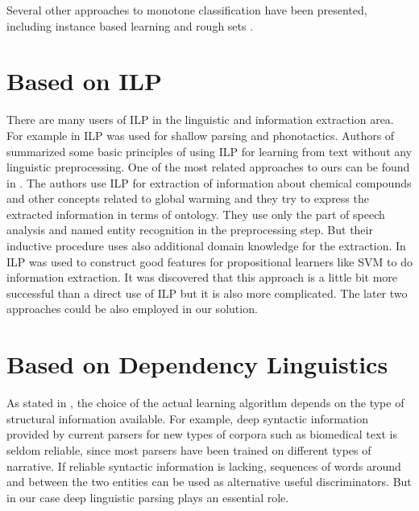 Several other approaches to monotone classification have been presented, including instance based learning \citep{biblio:ibl} and rough sets \citep{biblio:rough_sets}.









\section{Based on ILP}
There are many users of ILP in the linguistic and information extraction area.
For example in \citep{stasinos:phd} ILP was used for shallow parsing and phonotactics.
Authors of \citep{Junker99learningfor} summarized some basic principles of using ILP for learning from text without any linguistic preprocessing. One of the most related approaches to ours can be found in \citep{aitken02:_learn_infor_extrac_rules}. The authors use ILP for extraction of information about chemical compounds and other concepts related to global warming and they try to express the extracted information in terms of ontology. They use only the part of speech analysis and named entity recognition in the preprocessing step. But their inductive procedure uses also additional domain knowledge for the extraction. In \citep{Ramakrishnan:UsingILPforFeatures} ILP was used to construct good features for propositional learners like SVM to do information extraction. It was discovered that this approach is a little bit more successful than a direct use of ILP but it is also more complicated. The later two approaches could be also employed in our solution.

\section{Based on Dependency Linguistics}
As stated in \citep{Bunescu:phd}, the choice of the actual learning algorithm depends on the type of structural information available. For example, deep syntactic information provided by current parsers for new types of corpora such as biomedical text is seldom reliable, since most parsers have been trained on different types of narrative. If reliable syntactic information is lacking, sequences of words around and between the two entities can be used as alternative useful discriminators.
But in our case deep linguistic parsing plays an essential role.


